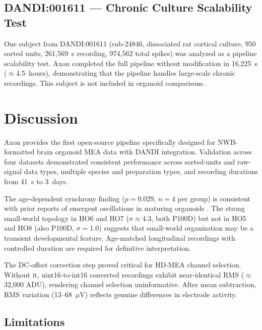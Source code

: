 \documentclass[11pt,a4paper]{article}
\begin{document}
\subsection{DANDI:001611 --- Chronic Culture Scalability Test}

One subject from DANDI:001611 (sub-24846, dissociated rat cortical culture, 
950 sorted units, 261,569~s recording, 974,562 total spikes) was analyzed as 
a pipeline scalability test. Axon completed the full pipeline without modification 
in 16,225~s ($\approx$4.5~hours), demonstrating that the pipeline handles 
large-scale chronic recordings. This subject is not included in organoid 
comparisons.

\section{Discussion}

Axon provides the first open-source pipeline specifically designed for NWB-formatted 
brain organoid MEA data with DANDI integration. Validation across four datasets 
demonstrated consistent performance across sorted-units and raw-signal data types, 
multiple species and preparation types, and recording durations from 41~s to 3~days.

The age-dependent synchrony finding ($p = 0.029$, $n = 4$ per group) is consistent 
with prior reports of emergent oscillations in maturing organoids \citep{trujillo2019}. 
The strong small-world topology in HO6 and HO7 ($\sigma \approx 4.3$, both P100D) 
but not in HO5 and HO8 (also P100D, $\sigma = 1.0$) suggests that small-world 
organization may be a transient developmental feature. Age-matched longitudinal 
recordings with controlled duration are required for definitive interpretation.

The DC-offset correction step proved critical for HD-MEA channel selection. Without 
it, uint16-to-int16 converted recordings exhibit near-identical RMS ($\approx$32,000 
ADU), rendering channel selection uninformative. After mean subtraction, RMS 
variation (13--68~$\mu$V) reflects genuine differences in electrode activity.

\subsection{Limitations}
\label{sec:limitations}
\end{document}
